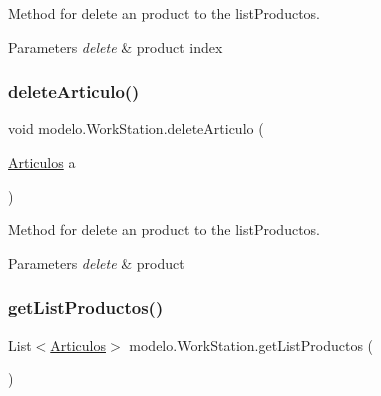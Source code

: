 Method for delete an product to the list\+Productos. 


\begin{DoxyParams}{Parameters}
{\em delete} & product index \\
\hline
\end{DoxyParams}
\mbox{\label{classmodelo_1_1_work_station_a2dad4fede50b2fc15db08f5914990d74}} 
\subsubsection{\texorpdfstring{delete\+Articulo()}{deleteArticulo()}\hspace{0.1cm}{\footnotesize\ttfamily [2/2]}}
{\footnotesize\ttfamily void modelo.\+Work\+Station.\+delete\+Articulo (\begin{DoxyParamCaption}\item[{\mbox{\hyperlink{classmodelo_1_1_articulos}{Articulos}}}]{a }\end{DoxyParamCaption})}



Method for delete an product to the list\+Productos. 


\begin{DoxyParams}{Parameters}
{\em delete} & product \\
\hline
\end{DoxyParams}
\mbox{\label{classmodelo_1_1_work_station_a6b1f1a4392c9e5e31bf6168b0cc33200}} 
\subsubsection{\texorpdfstring{get\+List\+Productos()}{getListProductos()}}
{\footnotesize\ttfamily List$<$\mbox{\hyperlink{classmodelo_1_1_articulos}{Articulos}}$>$ modelo.\+Work\+Station.\+get\+List\+Productos (\begin{DoxyParamCaption}{ }\end{DoxyParamCaption})}



